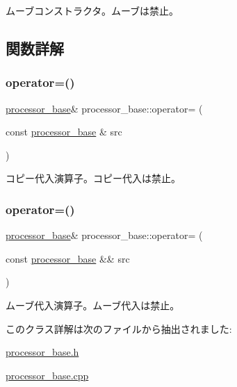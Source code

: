 ムーブコンストラクタ。ムーブは禁止。 

\subsection{関数詳解}
\hypertarget{classprocessor__base_a52553966ab699b15a1eb70a96211baac}{}\label{classprocessor__base_a52553966ab699b15a1eb70a96211baac} 
\subsubsection{\texorpdfstring{operator=()}{operator=()}\hspace{0.1cm}{\footnotesize\ttfamily [1/2]}}
{\footnotesize\ttfamily \hyperlink{classprocessor__base}{processor\+\_\+base}\& processor\+\_\+base\+::operator= (\begin{DoxyParamCaption}\item[{const \hyperlink{classprocessor__base}{processor\+\_\+base} \&}]{src }\end{DoxyParamCaption})\hspace{0.3cm}{\ttfamily [delete]}}

コピー代入演算子。コピー代入は禁止。 \hypertarget{classprocessor__base_a345a5ebd2dc94130c9a08f49fd82cb8d}{}\label{classprocessor__base_a345a5ebd2dc94130c9a08f49fd82cb8d} 
\subsubsection{\texorpdfstring{operator=()}{operator=()}\hspace{0.1cm}{\footnotesize\ttfamily [2/2]}}
{\footnotesize\ttfamily \hyperlink{classprocessor__base}{processor\+\_\+base}\& processor\+\_\+base\+::operator= (\begin{DoxyParamCaption}\item[{const \hyperlink{classprocessor__base}{processor\+\_\+base} \&\&}]{src }\end{DoxyParamCaption})\hspace{0.3cm}{\ttfamily [delete]}}

ムーブ代入演算子。ムーブ代入は禁止。 

このクラス詳解は次のファイルから抽出されました\+:\begin{DoxyCompactItemize}
\item 
\hyperlink{processor__base_8h}{processor\+\_\+base.\+h}\item 
\hyperlink{processor__base_8cpp}{processor\+\_\+base.\+cpp}\end{DoxyCompactItemize}
